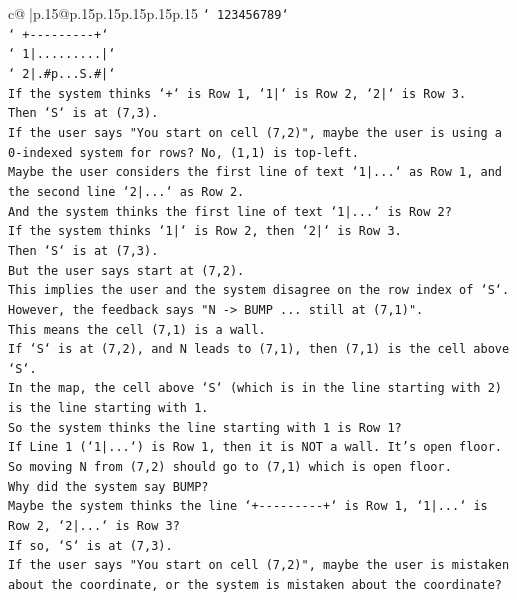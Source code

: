 \documentclass{article}
\begin{document}
{\begin{supertabular}{c@{$\;$}|p{.15\linewidth}@{}p{.15\linewidth}p{.15\linewidth}p{.15\linewidth}p{.15\linewidth}p{.15\linewidth}}
{{{\texttt{` 123456789`} \\
\texttt{`  +{-}{-}{-}{-}{-}{-}{-}{-}{-}+`} \\
\texttt{` 1|.........|`} \\
\texttt{` 2|.\#p...S.\#|`} \\
\texttt{If the system thinks `+` is Row 1, `1|` is Row 2, `2|` is Row 3.} \\
\texttt{Then `S` is at (7,3).} \\
\texttt{If the user says "You start on cell (7,2)", maybe the user is using a 0{-}indexed system for rows? No, (1,1) is top{-}left.} \\
\texttt{Maybe the user considers the first line of text `1|...` as Row 1, and the second line `2|...` as Row 2.} \\
\texttt{And the system thinks the first line of text `1|...` is Row 2?} \\
\texttt{If the system thinks `1|` is Row 2, then `2|` is Row 3.} \\
\texttt{Then `S` is at (7,3).} \\
\texttt{But the user says start at (7,2).} \\
\texttt{This implies the user and the system disagree on the row index of `S`.} \\
\texttt{However, the feedback says "N {-}> BUMP ... still at (7,1)".} \\
\texttt{This means the cell (7,1) is a wall.} \\
\texttt{If `S` is at (7,2), and N leads to (7,1), then (7,1) is the cell above `S`.} \\
\texttt{In the map, the cell above `S` (which is in the line starting with 2) is the line starting with 1.} \\
\texttt{So the system thinks the line starting with 1 is Row 1?} \\
\texttt{If Line 1 (`1|...`) is Row 1, then it is NOT a wall. It's open floor.} \\
\texttt{So moving N from (7,2) should go to (7,1) which is open floor.} \\
\texttt{Why did the system say BUMP?} \\
\texttt{Maybe the system thinks the line `+{-}{-}{-}{-}{-}{-}{-}{-}{-}+` is Row 1, `1|...` is Row 2, `2|...` is Row 3?} \\
\texttt{If so, `S` is at (7,3).} \\
\texttt{If the user says "You start on cell (7,2)", maybe the user is mistaken about the coordinate, or the system is mistaken about the coordinate?} \\
}}}
\end{supertabular}}
\end{document}
